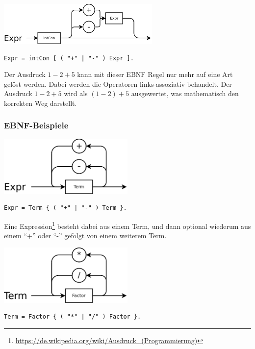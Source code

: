 \includegraphics[width=0.6\textwidth]{./media/images/compiler/ambiguity_correct.png}

\begin{lstlisting}[language=EBNF]
Expr = intCon [ ( "+" | "-" ) Expr ].
\end{lstlisting}

Der Ausdruck $1-2+5$ kann mit dieser EBNF Regel nur mehr auf eine Art gelöst werden. Dabei werden die Operatoren links-assoziativ behandelt. Der Ausdruck $1-2+5$ wird als $(1-2)+5$ ausgewertet, was mathematisch den korrekten Weg darstellt.

\subsubsection{EBNF-Beispiele}

\includegraphics[width=0.5\textwidth]{./media/images/compiler/ebnf_expr.png}

\begin{lstlisting}[language=EBNF]
Expr = Term { ( "+" | "-" ) Term }.
\end{lstlisting}

Eine Expression\footnote{\url{https://de.wikipedia.org/wiki/Ausdruck_(Programmierung)}} besteht dabei aus einem Term, und dann optional wiederum aus einem ``+'' oder ``-'' gefolgt von einem weiterem Term.

\includegraphics[width=0.5\textwidth]{./media/images/compiler/ebnf_term.png}
\begin{lstlisting}[language=EBNF]
Term = Factor { ( "*" | "/" ) Factor }.
\end{lstlisting}

